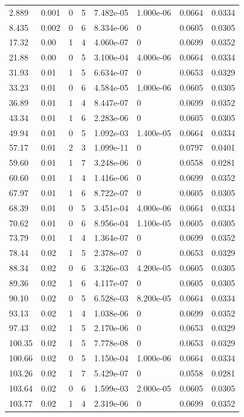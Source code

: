 \documentclass[preview]{standalone}
\begin{document}
{{\begin{tabular}{L{1.2cm}C{1.2cm} C{0.3cm}C{0.5cm} C{1.4cm}C{1.4cm} C{1.4cm}C{1.4cm}}
  2.889  &  0.001  & 0     &  5 &  7.482e-05  & 1.000e-06  & 0.0664 &  0.0334   \\ 
  8.435  &  0.002  & 0     &  6 &  8.334e-06  & 0  & 0.0605 &  0.0305   \\ 
  17.32  &  0.00  & 1     &  4 &  4.060e-07  & 0  & 0.0699 &  0.0352   \\ 
  21.88  &  0.00  & 0     &  5 &  3.100e-04  & 4.000e-06  & 0.0664 &  0.0334   \\ 
  31.93  &  0.01  & 1     &  5 &  6.634e-07  & 0  & 0.0653 &  0.0329   \\ 
  33.23  &  0.01  & 0     &  6 &  4.584e-05  & 1.000e-06  & 0.0605 &  0.0305   \\ 
  36.89  &  0.01  & 1     &  4 &  8.447e-07  & 0  & 0.0699 &  0.0352   \\ 
  43.34  &  0.01  & 1     &  6 &  2.283e-06  & 0  & 0.0605 &  0.0305   \\ 
  49.94  &  0.01  & 0     &  5 &  1.092e-03  & 1.400e-05  & 0.0664 &  0.0334   \\ 
  57.17  &  0.01  & 2     &  3 &  1.099e-11  & 0  & 0.0797 &  0.0401   \\ 
  59.60  &  0.01  & 1     &  7 &  3.248e-06  & 0  & 0.0558 &  0.0281   \\ 
  60.60  &  0.01  & 1     &  4 &  1.416e-06  & 0  & 0.0699 &  0.0352   \\ 
  67.97  &  0.01  & 1     &  6 &  8.722e-07  & 0  & 0.0605 &  0.0305   \\ 
  68.39  &  0.01  & 0     &  5 &  3.451e-04  & 4.000e-06  & 0.0664 &  0.0334   \\ 
  70.62  &  0.01  & 0     &  6 &  8.956e-04  & 1.100e-05  & 0.0605 &  0.0305   \\ 
  73.79  &  0.01  & 1     &  4 &  1.364e-07  & 0  & 0.0699 &  0.0352   \\ 
  78.44  &  0.02  & 1     &  5 &  2.378e-07  & 0  & 0.0653 &  0.0329   \\ 
  88.34  &  0.02  & 0     &  6 &  3.326e-03  & 4.200e-05  & 0.0605 &  0.0305   \\ 
  89.36  &  0.02  & 1     &  6 &  4.117e-07  & 0  & 0.0605 &  0.0305   \\ 
  90.10  &  0.02  & 0     &  5 &  6.528e-03  & 8.200e-05  & 0.0664 &  0.0334   \\ 
  93.13  &  0.02  & 1     &  4 &  1.038e-06  & 0  & 0.0699 &  0.0352   \\ 
  97.43  &  0.02  & 1     &  5 &  2.170e-06  & 0  & 0.0653 &  0.0329   \\ 
  100.35  &  0.02  & 1     &  5 &  7.778e-08  & 0  & 0.0653 &  0.0329   \\ 
  100.66  &  0.02  & 0     &  5 &  1.150e-04  & 1.000e-06  & 0.0664 &  0.0334   \\ 
  103.26  &  0.02  & 1     &  7 &  5.429e-07  & 0  & 0.0558 &  0.0281   \\ 
  103.64  &  0.02  & 0     &  6 &  1.599e-03  & 2.000e-05  & 0.0605 &  0.0305   \\ 
  103.77  &  0.02  & 1     &  4 &  2.319e-06  & 0  & 0.0699 &  0.0352   \\ 
\hline 
\end{tabular} 

}}
\end{document}
